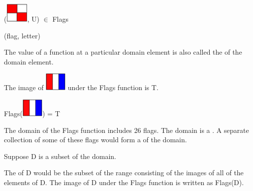 \documentclass{ximera}
\begin{document}
\begin{exercise}
 ({\includegraphics[width=42px,height=36px]{pics/flags/U.png}}, U) $\in$ Flags 

  \begin{multipleChoice}
  \end{multipleChoice}
  \begin{feedback}
(flag, letter)
  \end{feedback}
\end{exercise}





\begin{definition}
The value of a function at a particular domain element is also called the  of the domain element.
  
\end{definition}

\begin{example}

The image of {\includegraphics[width=40px,height=34px]{pics/flags/T.png}} under the Flags function is T.

Flags({\includegraphics[width=40px,height=34px]{pics/flags/T.png}}) = T

\end{example}




\begin{definition}
  The domain of the Flags function includes 26 flags.  The domain is a .  A separate collection of some of these flags would form a  of the domain.
  
  Suppose D is a subset of the domain.
  
  The  of D would be the subset of the range consisting of the images of all of the elements of D. The image of D under the Flags function is written as Flags(D).
 
  
\end{definition}
\end{document}
